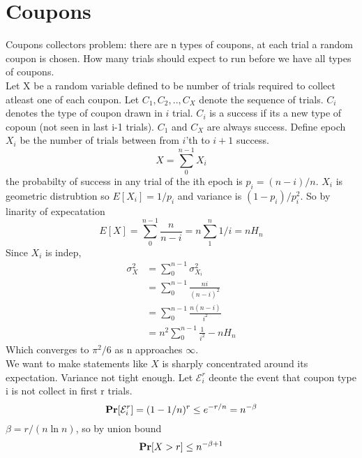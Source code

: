 \documentclass[a4paper]{article}
\def\Pr{\mbox{\textbf{Pr}}}
\begin{document}
\section{Coupons}
Coupons collectors problem: there are n types of coupons, at each trial a random coupon is chosen. How many trials should expect to run before we have all types of coupons.\\
Let X be a random variable defined to be number of trials required to collect atleast one of each coupon. Let \(C_1,C_2,..,C_X\) denote the sequence of trials. \(C_i\) denotes the type of coupon  drawn in \(i\) trial. \(C_i\) is a success if its a new type of copoun (not seen in last i-1 trials). \(C_1\) and \(C_X\) are always success. Define epoch \(X_i\) be the number of trials between from \(i\)'th to \(i+1\) success.
\[X = \sum_0^{n-1} X_i\]
the probabilty of success in any trial of the ith epoch is \(p_i = (n-i)/n\). \(X_i\) is geometric distrubtion so \(E[X_i] = 1/p_i\) and variance is \( (1-p_i)/p^2_i\). So by linarity of expecatation
\[E[X] = \sum_0^{n-1} \frac{n}{n-i} =n \sum_1^n 1/i= n H_n\]
Since \(X_i\) is indep, 
\begin{align}
\sigma_X^2 &= \sum_0^{n-1} \sigma_{X_i}^2\\
           &= \sum_0^{n-1} \frac{ni}{(n-i)^2}\\
           &= \sum_0^{n-1} \frac{n(n-i)}{i^2}\\
           &= n^2\sum_0^{n-1} \frac{1}{i^2} - nH_n
\end{align}
Which converges to \(\pi^2/6\) as n approaches \(\infty\).\\
We want to make statements like \(X\) is sharply concentrated around its expectation. Variance not tight enough. Let \(\mathcal{E}^r_i\) deonte the event that coupon type i is not collect in first r trials. 
\[\Pr[\mathcal{E}^r_i]=(1-1/n)^r \leq e^{-r/n} = n^{-\beta} \]
\(\beta=r/(n \ln n)\), so by union bound
\[\Pr[X > r] \leq n^{-\beta +1}\]
\end{document}
